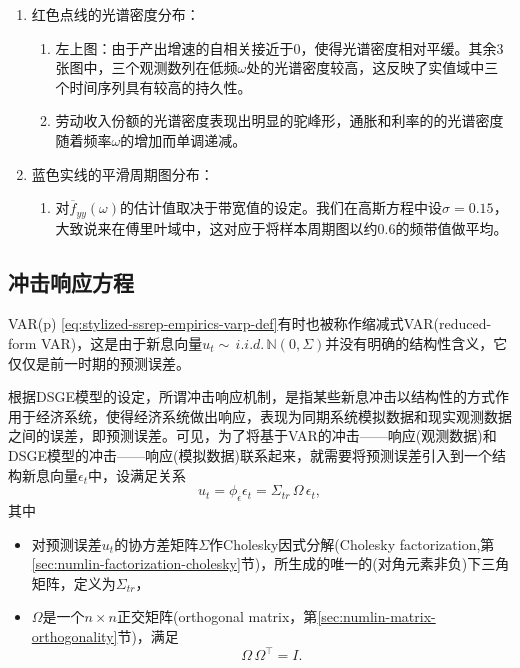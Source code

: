 \begin{enumerate}
  \item 红色点线的光谱密度分布：
\begin{enumerate}
  \item 左上图：由于产出增速的自相关接近于$0$，使得光谱密度相对平缓。其余3张图中，三个观测数列在低频$\omega$处的光谱密度较高，这反映了实值域中三个时间序列具有较高的持久性。
  \item 劳动收入份额的光谱密度表现出明显的驼峰形，通胀和利率的的光谱密度随着频率$\omega$的增加而单调递减。
\end{enumerate}
\item 蓝色实线的平滑周期图分布：
\begin{enumerate}
  \item 对$\overline{f}_{yy} \left( \omega \right)$的估计值取决于带宽值的设定。我们在高斯方程中设$\sigma = 0.15$，大致说来在傅里叶域中，这对应于将样本周期图以约0.6的频带值做平均。
  \end{enumerate}
\end{enumerate}

\subsection{冲击响应方程}
\label{sec:stylized-ssrep-empirics-irfs}

VAR(p) \eqref{eq:stylized-ssrep-empirics-varp-def}有时也被称作缩减式VAR(reduced-form VAR)，这是由于新息向量$u_{t} \sim \, i.i.d. \, \mathbb{N} \left( 0, \Sigma \right)$并没有明确的结构性含义，它仅仅是前一时期的预测误差。

根据DSGE模型的设定，所谓冲击响应机制，是指某些新息冲击以结构性的方式作用于经济系统，使得经济系统做出响应，表现为同期系统模拟数据和现实观测数据之间的误差，即预测误差。可见，为了将基于VAR的冲击——响应(观测数据)和DSGE模型的冲击——响应(模拟数据)联系起来，就需要将预测误差引入到一个结构新息向量$\epsilon_{t}$中，设满足关系
\begin{equation}
  \label{eq:stylized-ssrep-svar-forecast-error}
  u_{t} = \phi_{\epsilon} \epsilon_{t} = \Sigma_{tr} \, \Omega \, \epsilon_{t},
\end{equation}
其中
\begin{itemize}
\item 对预测误差$u_{t}$的协方差矩阵$\Sigma$作Cholesky因式分解(Cholesky factorization,第\ref{sec:numlin-factorization-cholesky}节)，所生成的唯一的(对角元素非负)下三角矩阵，定义为$\Sigma_{tr}$，
\item $\Omega$是一个$n \times n$正交矩阵(orthogonal matrix，第\ref{sec:numlin-matrix-orthogonality}节)，满足
\begin{equation*}
  \Omega \, \Omega^{\top} = I.
\end{equation*}
\end{itemize}

